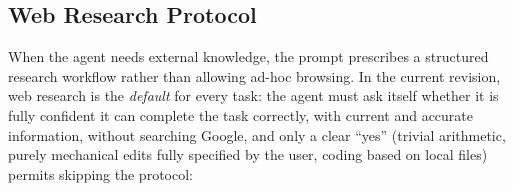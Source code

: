 \documentclass{article}
\begin{document}
\subsection{Web Research Protocol}

When the agent needs external knowledge, the prompt prescribes a structured research workflow rather than allowing ad-hoc browsing.  In the current revision, web research is the \emph{default} for every task: the agent must ask itself whether it is fully confident it can complete the task correctly, with current and accurate information, without searching Google, and only a clear ``yes'' (trivial arithmetic, purely mechanical edits fully specified by the user, coding based on local files) permits skipping the protocol:
\end{document}
